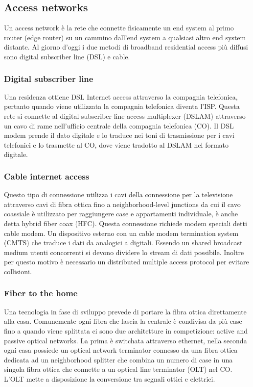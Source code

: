 \subsection{Access networks}
Un access network \`e la rete che connette fisicamente un end system al primo router (edge router) su un cammino dall'end system a qualsiasi altro end system distante. Al giorno d'oggi i due metodi di
broadband residential access pi\`u diffusi sono digital subscriber line (DSL) e cable. 
\subsubsection{Digital subscriber line}
Una residenza ottiene DSL Internet access attraverso la compagnia telefonica, pertanto quando viene utilizzata la compagnia
telefonica diventa l'ISP. Questa rete si connette al digital subscriber line access multiplexer (DSLAM) attraverso un cavo di rame nell'ufficio centrale della compagnia telefonica (CO).  Il DSL modem prende il
dato digitale e lo traduce nei toni di trasmissione per i cavi telefonici e lo trasmette al CO, dove viene tradotto al DSLAM nel formato digitale. 
\subsubsection{Cable internet access}
Questo tipo di connessione utilizza i cavi della connessione per la televisione attraverso cavi di fibra ottica fino a neighborhood-level junctions da cui il cavo coassiale \`e utilizzato per raggiungere case e 
appartamenti individuale, \`e anche detta hybrid fiber coax (HFC). Questa connessione richiede modem speciali detti cable modem. Un dispositivo esterno con un cable modem termination system (CMTS)
che traduce i dati da analogici a digitali. Essendo un shared broadcast medium utenti concorrenti si devono dividere lo stream di dati possibile. Inoltre per questo motivo \`e necessario un distributed multiple 
access protocol per evitare collisioni. 
\subsubsection{Fiber to the home}
Una tecnologia in fase di sviluppo prevede di portare la fibra ottica direttamente alla casa. Comunemente ogni fibra che lascia la centrale \`e condivisa da pi\`u case fino a quando viene splittata ci sono
due architetture in competizione: active and passive optical networks. La prima \`e switchata attraverso ethernet, nella seconda ogni casa possiede un optical network terminator connesso da una fibra ottica 
dedicata ad un neighborhood splitter che combina un numero di case in una singola fibra ottica che connette a un optical line terminator (OLT) nel CO. L'OLT mette a disposizione la conversione tra segnali
ottici e elettrici. 
